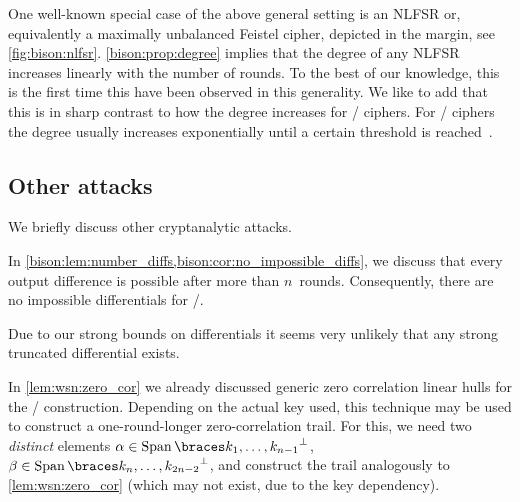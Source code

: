 One well-known special case of the above general setting is an NLFSR or, equivalently a maximally unbalanced Feistel cipher, depicted in the margin, see \cref{fig:bison:nlfsr}.
\cref{bison:prop:degree} implies that the degree of any NLFSR increases linearly with the number of rounds.
To the best of our knowledge, this is the first time this have been observed in this generality.
We like to add that this is in sharp contrast to how the degree increases for \SPN/ ciphers.
For \SPN/ ciphers the degree usually increases exponentially until a certain threshold is reached~\cite{FSE:BouCanDeC11}.

\subsection{Other attacks}
\label{subsec:bison-other-attacks}
We briefly discuss other cryptanalytic attacks.

In \cref{bison:lem:number_diffs,bison:cor:no_impossible_diffs}, we discuss that every output difference is possible after more than $n$~rounds.
Consequently, there are no impossible differentials for \bison/.

Due to our strong bounds on differentials it seems very unlikely that any strong truncated differential exists.

In \cref{lem:wsn:zero_cor} we already discussed generic zero correlation linear hulls for the \WSN/ construction.
Depending on the actual key used, this technique may be used to construct a one-round-longer zero-correlation trail.
For this, we need two \emph{distinct} elements $\alpha \in \Span{k_1, \dots, k_{n-1}}^\perp$, $\beta \in \Span{k_n, \dots, k_{2n-2}}^\perp$, and construct the trail analogously to \cref{lem:wsn:zero_cor} (which may not exist, due to the key dependency).

